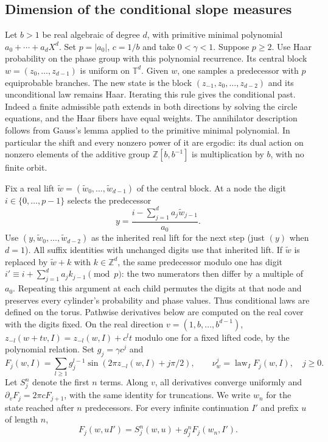 \documentclass[11pt,a4paper]{article}
\begin{document}
\subsection{Dimension of the conditional slope measures}\label{sec:slopes}
Let $b>1$ be real algebraic of degree $d$, with primitive minimal
polynomial $a_0+\cdots+a_dX^d$. Set $p=|a_0|$, $c=1/b$ and take
$0<\gamma<1$. Suppose $p\ge2$. Use Haar probability on the phase
group with this polynomial recurrence. Its central block
$w=(z_0,\ldots,z_{d-1})$ is uniform on $\mathbb T^d$. Given $w$,
one samples a predecessor with $p$ equiprobable branches. The new
state is the block $(z_{-1},z_0,\ldots,z_{d-2})$ and its unconditional
law remains Haar. Iterating this rule gives the conditional past.
Indeed a finite admissible path extends in both directions by solving
the circle equations, and the Haar fibers have equal weights.
The annihilator description follows from Gauss's lemma applied to the
primitive minimal polynomial. In particular the shift and every nonzero
power of it are ergodic: its dual action on nonzero elements of the
additive group $\mathbb Z[b,b^{-1}]$ is multiplication by $b$, with
no finite orbit.

Fix a real lift $\widetilde w=(\widetilde w_0,\ldots,\widetilde w_{d-1})$
of the central block. At a node the digit $i\in\{0,\ldots,p-1\}$
selects the predecessor
\[
 y=\frac{i-\sum_{j=1}^d a_j\widetilde w_{j-1}}{a_0}.
\]
Use $(y,\widetilde w_0,\ldots,\widetilde w_{d-2})$ as the inherited
real lift for the next step (just $(y)$ when $d=1$).
All suffix identities with unchanged digits use that inherited lift.
If $\widetilde w$ is replaced by $\widetilde w+k$ with $k\in\mathbb Z^d$,
the same predecessor modulo one has digit
$i'\equiv i+\sum_{j=1}^d a_j k_{j-1}\pmod p$: the two numerators then
differ by a multiple of $a_0$. Repeating this argument at each child
permutes the digits at that node and preserves every cylinder's
probability and phase values. Thus conditional laws are defined on the
torus. Pathwise derivatives below are computed on the real cover with
the digits fixed. On the real direction
$v=(1,b,\ldots,b^{d-1})$, $z_{-l}(w+tv,I)=z_{-l}(w,I)+c^l t$
modulo one for a fixed lifted code, by the polynomial relation.
Set $g_j=\gamma c^j$ and
\[
 F_j(w,I)=\sum_{l\ge1}g_j^{l-1}\sin(2\pi z_{-l}(w,I)+j\pi/2),
 \qquad \nu^j_w=\operatorname{law}_I F_j(w,I),\quad j\ge0 .
\]
Let $S_j^n$ denote the first $n$ terms. Along $v$, all derivatives
converge uniformly and $\partial_v F_j=2\pi c F_{j+1}$, with the
same identity for truncations. We write $w_n$ for the state reached
after $n$ predecessors. For every infinite continuation $I'$ and
prefix $u$ of length $n$,
\[
      F_j(w,uI')=S_j^n(w,u)+g_j^n F_j(w_n,I').
\]
\end{document}
